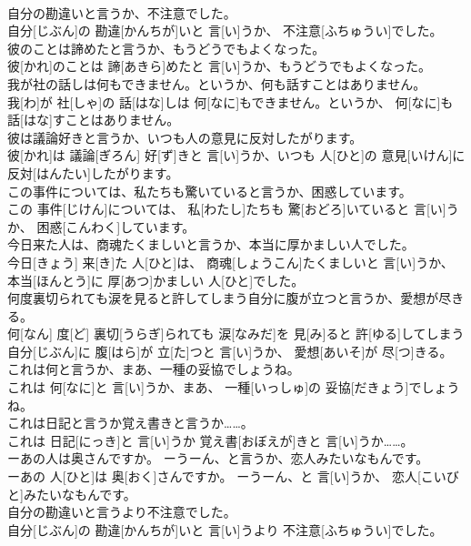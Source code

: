 \documentclass[8pt]{extreport}
\begin{document}
\begin{CJK}{UTF8}{min}
\\	自分の勘違いと言うか、不注意でした。	
\\	自分[じぶん]の 勘違[かんちが]いと 言[い]うか、 不注意[ふちゅうい]でした。
\\	彼のことは諦めたと言うか、もうどうでもよくなった。	
\\	彼[かれ]のことは 諦[あきら]めたと 言[い]うか、もうどうでもよくなった。
\\	我が社の話しは何もできません。というか、何も話すことはありません。	
\\	我[わ]が 社[しゃ]の 話[はな]しは 何[なに]もできません。というか、 何[なに]も 話[はな]すことはありません。
\\	彼は議論好きと言うか、いつも人の意見に反対したがります。	
\\	彼[かれ]は 議論[ぎろん] 好[ず]きと 言[い]うか、いつも 人[ひと]の 意見[いけん]に 反対[はんたい]したがります。
\\	この事件については、私たちも驚いていると言うか、困惑しています。	
\\	この 事件[じけん]については、 私[わたし]たちも 驚[おどろ]いていると 言[い]うか、 困惑[こんわく]しています。
\\	今日来た人は、商魂たくましいと言うか、本当に厚かましい人でした。	
\\	今日[きょう] 来[き]た 人[ひと]は、 商魂[しょうこん]たくましいと 言[い]うか、 本当[ほんとう]に 厚[あつ]かましい 人[ひと]でした。
\\	何度裏切られても涙を見ると許してしまう自分に腹が立つと言うか、愛想が尽きる。	
\\	何[なん] 度[ど] 裏切[うらぎ]られても 涙[なみだ]を 見[み]ると 許[ゆる]してしまう 自分[じぶん]に 腹[はら]が 立[た]つと 言[い]うか、 愛想[あいそ]が 尽[つ]きる。
\\	これは何と言うか、まあ、一種の妥協でしょうね。	
\\	これは 何[なに]と 言[い]うか、まあ、 一種[いっしゅ]の 妥協[だきょう]でしょうね。
\\	これは日記と言うか覚え書きと言うか……。	
\\	これは 日記[にっき]と 言[い]うか 覚え書[おぼえが]きと 言[い]うか……。
\\	ーあの人は奥さんですか。 ーうーん、と言うか、恋人みたいなもんです。	
\\	ーあの 人[ひと]は 奥[おく]さんですか。 ーうーん、と 言[い]うか、 恋人[こいびと]みたいなもんです。
\\	自分の勘違いと言うより不注意でした。	
\\	自分[じぶん]の 勘違[かんちが]いと 言[い]うより 不注意[ふちゅうい]でした。

\end{CJK}
\end{document}
